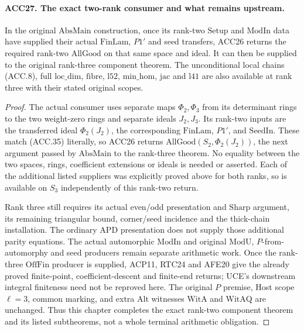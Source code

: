 \paragraph{ACC27. The exact two-rank consumer and what remains upstream.}
\label{claim:ACC27}
In the original \(\mathrm{AbsMain}\) construction, once its
rank-two \(\mathrm{Setup}\) and \(\mathrm{ModIn}\) data have
supplied their actual \(\mathrm{FinLam}\), \(P1'\) and seed
transfers, ACC26 returns the required rank-two \(\mathrm{AllGood}\)
on that same space and ideal.  It can then be supplied to the
original rank-three component theorem.  The unconditional local
chains (ACC.8), full \(\mathrm{loc\_dim}\), \(\mathrm{fibre}\),
\(\mathrm{l52}\), \(\mathrm{min\_hom}\), \(\mathrm{jac}\)
and \(\mathrm{l41}\) are also available at rank three with
their stated original scopes.

\begin{proof}
The actual consumer uses separate maps \(\Phi_2,\Phi_3\) from
its determinant rings to the two weight-zero rings and separate
ideals \(J_2,J_3\).  Its rank-two inputs are the transferred
ideal \(\Phi_2(J_2)\), the corresponding \(\mathrm{FinLam}\),
\(P1'\), and \(\mathrm{SeedIn}\).  These match (ACC.35)
literally, so ACC26 returns
\(\mathrm{AllGood}(S_2,\Phi_2(J_2))\), the next argument
passed by \(\mathrm{AbsMain}\) to the rank-three theorem.
No equality between the two spaces, rings, coefficient extensions
or ideals is needed or asserted.  Each of the additional listed
suppliers was explicitly proved above for both ranks, so is
available on \(S_3\) independently of this rank-two return.

Rank three still requires its actual even/odd presentation and
\(\mathrm{Sharp}\) argument, its remaining triangular bound,
corner/seed incidence and the thick-chain installation.  The ordinary
APD presentation does not supply those additional parity equations.
The actual automorphic \(\mathrm{ModIn}\) and original
\(\mathrm{ModU}\), \(P\)-from-automorphy and seed producers
remain separate arithmetic work.  Once the rank-three \(\mathrm{OffFin}\)
producer is supplied, ACP11, RTC24 and AFE20 give the already
proved finite-point, coefficient-descent and finite-end returns;
UCE's downstream integral finiteness need not be reproved here.
The original \(P\) premise, Host scope \(\ell=3\), common
marking, and extra Alt witnesses \(\mathrm{WitA}\) and
\(\mathrm{WitAQ}\) are unchanged.  Thus this chapter completes
the exact rank-two component theorem and its listed subtheorems,
not a whole terminal arithmetic obligation.
\end{proof}

